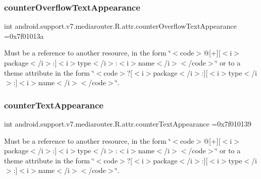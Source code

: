 \subsubsection{\texorpdfstring{counter\+Overflow\+Text\+Appearance}{counterOverflowTextAppearance}}
{\footnotesize\ttfamily int android.\+support.\+v7.\+mediarouter.\+R.\+attr.\+counter\+Overflow\+Text\+Appearance =0x7f01013a\hspace{0.3cm}{\ttfamily [static]}}

Must be a reference to another resource, in the form \char`\"{}$<$code$>$@\mbox{[}+\mbox{]}\mbox{[}$<$i$>$package$<$/i$>$\+:\mbox{]}$<$i$>$type$<$/i$>$\+:$<$i$>$name$<$/i$>$$<$/code$>$\char`\"{} or to a theme attribute in the form \char`\"{}$<$code$>$?\mbox{[}$<$i$>$package$<$/i$>$\+:\mbox{]}\mbox{[}$<$i$>$type$<$/i$>$\+:\mbox{]}$<$i$>$name$<$/i$>$$<$/code$>$\char`\"{}. \mbox{\label{classandroid_1_1support_1_1v7_1_1mediarouter_1_1R_1_1attr_ae2781dd8f0eed4b5270ab26c4e25229c}} 
\subsubsection{\texorpdfstring{counter\+Text\+Appearance}{counterTextAppearance}}
{\footnotesize\ttfamily int android.\+support.\+v7.\+mediarouter.\+R.\+attr.\+counter\+Text\+Appearance =0x7f010139\hspace{0.3cm}{\ttfamily [static]}}

Must be a reference to another resource, in the form \char`\"{}$<$code$>$@\mbox{[}+\mbox{]}\mbox{[}$<$i$>$package$<$/i$>$\+:\mbox{]}$<$i$>$type$<$/i$>$\+:$<$i$>$name$<$/i$>$$<$/code$>$\char`\"{} or to a theme attribute in the form \char`\"{}$<$code$>$?\mbox{[}$<$i$>$package$<$/i$>$\+:\mbox{]}\mbox{[}$<$i$>$type$<$/i$>$\+:\mbox{]}$<$i$>$name$<$/i$>$$<$/code$>$\char`\"{}. \mbox{\label{classandroid_1_1support_1_1v7_1_1mediarouter_1_1R_1_1attr_a3b3733a1976437f986f9b8cc4c34a6a5}} 
